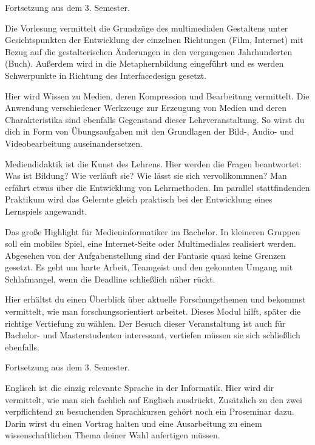 Fortsetzung aus dem 3. Semester.

\newpage

Die Vorlesung vermittelt die Grundzüge des multimedialen Gestaltens unter Gesichtspunkten der Entwicklung der einzelnen Richtungen (Film, Internet) mit Bezug auf die gestalterischen Änderungen in den vergangenen Jahrhunderten (Buch).
Außerdem wird in die Metaphernbildung eingeführt und es werden Schwerpunkte in Richtung des Interfacedesign gesetzt.

Hier wird Wissen zu Medien, deren Kompression und Bearbeitung vermittelt.
Die Anwendung verschiedener Werkzeuge zur Erzeugung von Medien und deren Charakteristika sind ebenfalls Gegenstand dieser Lehrveranstaltung.
So wirst du dich in Form von Übungsaufgaben mit den Grundlagen der Bild-, Audio- und Videobearbeitung auseinandersetzen.

Mediendidaktik ist die \glqq Kunst des Lehrens\grqq.
Hier werden die Fragen beantwortet:
Was ist Bildung?
Wie verläuft sie?
Wie lässt sie sich vervollkommnen?
Man erfährt etwas über die Entwicklung von Lehrmethoden.
Im parallel stattfindenden Praktikum wird das Gelernte gleich praktisch bei der Entwicklung eines Lernspiels angewandt.

Das große Highlight für Medieninformatiker im Bachelor.
In kleineren Gruppen soll ein mobiles Spiel, eine Internet-Seite oder Multimediales realisiert werden.
Abgesehen von der Aufgabenstellung sind der Fantasie quasi keine Grenzen gesetzt.
Es geht um harte Arbeit, Teamgeist und den gekonnten Umgang mit Schlafmangel, wenn die Deadline schließlich näher rückt.

Hier erhältst du einen Überblick über aktuelle Forschungsthemen und bekommst vermittelt, wie man forschungsorientiert arbeitet.
Dieses Modul hilft, später die richtige Vertiefung zu wählen. Der Besuch dieser Veranstaltung ist auch für Bachelor- und Masterstudenten interessant, vertiefen müssen sie sich schließlich ebenfalls.

Fortsetzung aus dem 3. Semester.

\newpage

Englisch ist die einzig relevante Sprache in der Informatik.
Hier wird dir vermittelt, wie man sich fachlich auf Englisch ausdrückt. Zusätzlich zu den zwei verpflichtend zu besuchenden Sprachkursen gehört noch ein Proseminar dazu.
Darin wirst du einen Vortrag halten und eine Ausarbeitung zu einem wissenschaftlichen Thema deiner Wahl anfertigen müssen.

